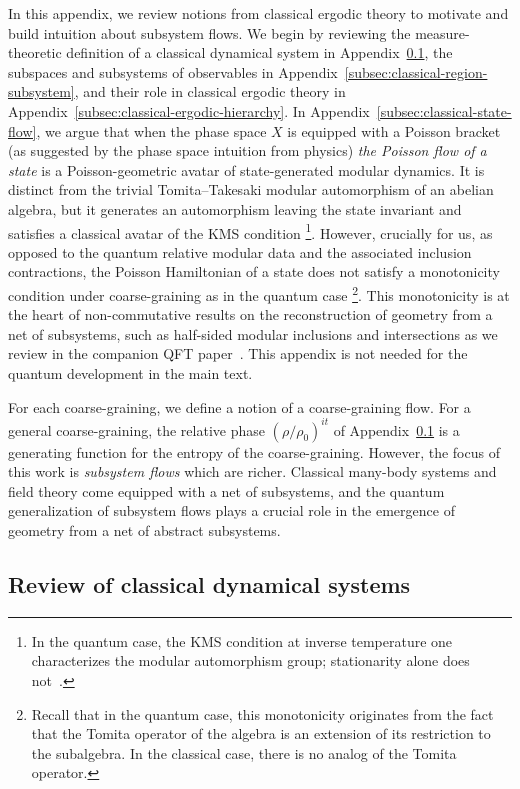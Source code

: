 \documentclass[a4paper,11pt]{article}
\theoremstyle{definition}
\begin{document}
In this appendix, we review notions from classical ergodic theory to motivate and build intuition about subsystem flows.
We begin by reviewing the measure-theoretic definition of a classical dynamical system in Appendix~\ref{subsec:classical-definitions}, the subspaces and subsystems of observables in Appendix~\ref{subsec:classical-region-subsystem}, and their role in classical ergodic theory in Appendix~\ref{subsec:classical-ergodic-hierarchy}. In Appendix~\ref{subsec:classical-state-flow}, we argue that when the phase space $X$ is equipped with a Poisson bracket (as suggested by the phase space intuition from physics) {\it the Poisson flow of a state} is a Poisson-geometric avatar of state-generated modular dynamics. It is distinct from the trivial Tomita--Takesaki modular automorphism of an abelian algebra, but it generates an automorphism leaving the state invariant and satisfies a classical avatar of the KMS condition \footnote{In the quantum case, the KMS condition at inverse temperature one characterizes the modular automorphism group; stationarity alone does not~\cite{Takesaki1970}.}. However, crucially for us, as opposed to the quantum relative modular data and the associated inclusion contractions, the Poisson Hamiltonian of a state does not satisfy a monotonicity condition under coarse-graining as in the quantum case \footnote{Recall that in the quantum case, this monotonicity originates from the fact that the Tomita operator of the algebra is an extension of its restriction to the subalgebra. In the classical case, there is no analog of the Tomita operator.}. This monotonicity is at the heart of non-commutative results on the reconstruction of geometry from a net of subsystems, such as half-sided modular inclusions and intersections as we review in the companion QFT paper~\cite{companionQFT}. This appendix is not needed for the quantum development in the main text.

For each coarse-graining, we define a notion of a coarse-graining flow. For a general coarse-graining, the relative phase $(\rho/\rho_0)^{it}$ of Appendix~\ref{subsec:classical-definitions} is a generating function for the entropy of the coarse-graining. However, the focus of this work is {\it subsystem flows} which are richer.
Classical many-body systems and field theory come equipped with a net of subsystems, and the quantum generalization of subsystem flows plays a crucial role in the emergence of geometry from a net of abstract subsystems.

\subsection{Review of classical dynamical systems}\label{subsec:classical-definitions}
\end{document}
